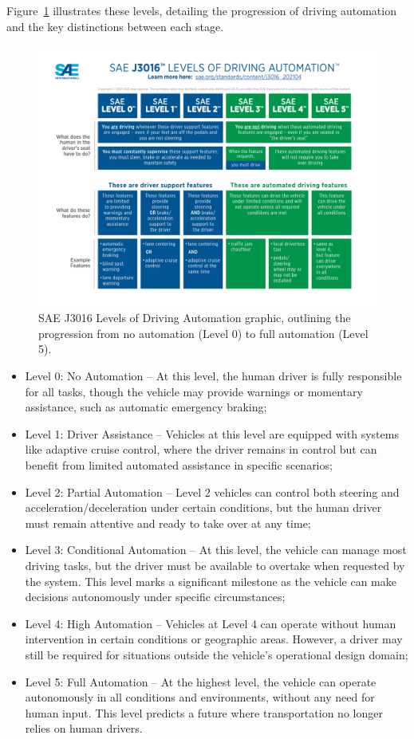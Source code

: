 Figure~\ref{fig:sae_levels} illustrates these levels, detailing the progression of driving automation and the key distinctions between each stage.
\begin{figure}[H]
    \centering
    \includegraphics[width=1\linewidth]{LateX//figs/sae-j3016-visual-chart_5.3.21.pdf}
    \caption{SAE J3016 Levels of Driving Automation graphic, outlining the progression from no automation (Level 0) to full automation (Level 5).}
    \label{fig:sae_levels}
\end{figure}

\begin{itemize}
    \item Level 0: No Automation – At this level, the human driver is fully responsible for all tasks, though the vehicle may provide warnings or momentary assistance, such as automatic emergency braking;
    \item Level 1: Driver Assistance – Vehicles at this level are equipped with systems like adaptive cruise control, where the driver remains in control but can benefit from limited automated assistance in specific scenarios;
    \item Level 2: Partial Automation – Level 2 vehicles can control both steering and acceleration/deceleration under certain conditions, but the human driver must remain attentive and ready to take over at any time;
    \item Level 3: Conditional Automation – At this level, the vehicle can manage most driving tasks, but the driver must be available to overtake when requested by the system. This level marks a significant milestone as the vehicle can make decisions autonomously under specific circumstances;
    \item Level 4: High Automation – Vehicles at Level 4 can operate without human intervention in certain conditions or geographic areas. However, a driver may still be required for situations outside the vehicle's operational design domain;
    \item Level 5: Full Automation – At the highest level, the vehicle can operate autonomously in all conditions and environments, without any need for human input. This level predicts a future where transportation no longer relies on human drivers.
\end{itemize}

